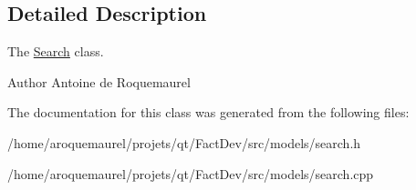 \subsection{Detailed Description}
The \hyperlink{classSearch}{Search} class. 

\begin{DoxyAuthor}{Author}
Antoine de Roquemaurel 
\end{DoxyAuthor}


The documentation for this class was generated from the following files\-:\begin{DoxyCompactItemize}
\item 
/home/aroquemaurel/projets/qt/\-Fact\-Dev/src/models/search.\-h\item 
/home/aroquemaurel/projets/qt/\-Fact\-Dev/src/models/search.\-cpp\end{DoxyCompactItemize}
